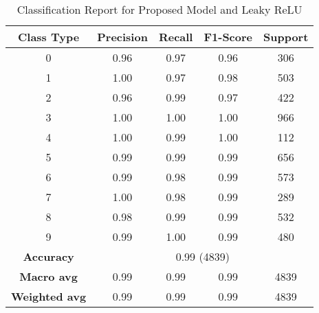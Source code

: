 \documentclass[12pt, English]{article}
\begin{document}
\begin{normalsize}
\begin{table}[htbp]
  \centering
  \renewcommand{\thetable}{6.3}
  \caption{Classification Report for Proposed Model and Leaky ReLU}
  \label{tab:classification_leaky_relu}
  \begin{tabular}{|c|c|c|c|c|}
    \hline
    \textbf{Class Type} & \textbf{Precision} & \textbf{Recall} & \textbf{F1-Score} & \textbf{Support} \\
    \hline
    0 & 0.96 & 0.97 & 0.96 & 306 \\
    \hline
    1 & 1.00 & 0.97 & 0.98 & 503 \\
    \hline
    2 & 0.96 & 0.99 & 0.97 & 422 \\
    \hline
    3 & 1.00 & 1.00 & 1.00 & 966 \\
    \hline
    4 & 1.00 & 0.99 & 1.00 & 112 \\
    \hline
    5 & 0.99 & 0.99 & 0.99 & 656 \\
    \hline
    6 & 0.99 & 0.98 & 0.99 & 573 \\
    \hline
    7 & 1.00 & 0.98 & 0.99 & 289 \\
    \hline
    8 & 0.98 & 0.99 & 0.99 & 532 \\
    \hline
    9 & 0.99 & 1.00 & 0.99 & 480 \\
    \hline
    \textbf{Accuracy} & \multicolumn{4}{|c|}{0.99 (4839)} \\
    \hline
    \textbf{Macro avg} & 0.99 & 0.99 & 0.99 & 4839 \\
    \hline
    \textbf{Weighted avg} & 0.99 & 0.99 & 0.99 & 4839 \\
    \hline
  \end{tabular}
\end{table}




\end{normalsize}
\end{document}
